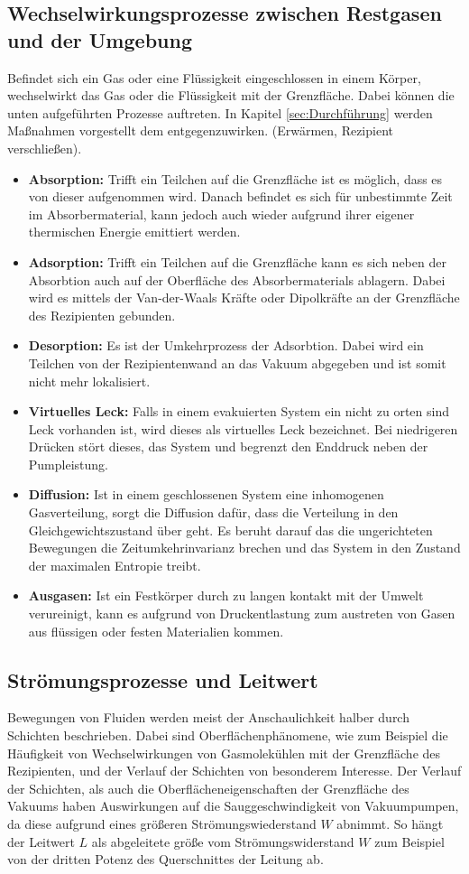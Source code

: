 \subsection{Wechselwirkungsprozesse zwischen Restgasen und der Umgebung}
Befindet sich ein Gas oder eine Flüssigkeit eingeschlossen in einem Körper, wechselwirkt das Gas oder die Flüssigkeit mit der Grenzfläche. Dabei können die unten aufgeführten Prozesse auftreten. In Kapitel \ref{sec:Durchführung} werden Maßnahmen vorgestellt dem entgegenzuwirken. (Erwärmen, Rezipient verschließen).
\begin{itemize}
  \item \textbf{Absorption:} Trifft ein Teilchen auf die Grenzfläche ist es möglich, dass es von dieser aufgenommen wird. Danach befindet es sich für unbestimmte Zeit im Absorbermaterial, kann jedoch auch wieder aufgrund ihrer eigener thermischen Energie emittiert werden.
  \item \textbf{Adsorption:} Trifft ein Teilchen auf die Grenzfläche kann es sich neben der Absorbtion auch auf der Oberfläche des Absorbermaterials ablagern. Dabei wird es mittels der Van-der-Waals Kräfte oder Dipolkräfte an der Grenzfläche des Rezipienten gebunden.
  \item \textbf{Desorption:} Es ist der Umkehrprozess der Adsorbtion. Dabei wird ein Teilchen von der Rezipientenwand an das Vakuum abgegeben und ist somit nicht mehr lokalisiert.
  \item \textbf{Virtuelles Leck:} Falls in einem evakuierten System ein nicht zu orten sind Leck vorhanden ist, wird dieses als virtuelles Leck bezeichnet. Bei niedrigeren Drücken stört dieses, das System und begrenzt den Enddruck neben der Pumpleistung.
  \item \textbf{Diffusion:} Ist in einem geschlossenen System eine inhomogenen Gasverteilung, sorgt die Diffusion dafür, dass die Verteilung in den Gleichgewichtszustand über geht. Es beruht darauf das die ungerichteten Bewegungen die Zeitumkehrinvarianz brechen und das System in den Zustand der maximalen Entropie treibt.
  \item \textbf{Ausgasen:} Ist ein Festkörper durch zu langen kontakt mit der Umwelt verureinigt, kann es aufgrund von Druckentlastung zum austreten von Gasen aus flüssigen oder festen Materialien kommen.
\end{itemize}
\subsection{Strömungsprozesse und Leitwert}
Bewegungen von Fluiden werden meist der Anschaulichkeit halber durch Schichten beschrieben. Dabei sind Oberflächenphänomene, wie zum Beispiel die Häufigkeit von Wechselwirkungen von Gasmolekühlen mit der Grenzfläche des Rezipienten, und der Verlauf der Schichten von besonderem Interesse. Der Verlauf der Schichten, als auch die Oberflächeneigenschaften der Grenzfläche des Vakuums haben Auswirkungen auf die Sauggeschwindigkeit von Vakuumpumpen, da diese aufgrund eines größeren Strömungswiederstand $W$ abnimmt. So hängt der Leitwert $L$ als abgeleitete größe vom Strömungswiderstand $W$ zum Beispiel von der dritten Potenz des Querschnittes der Leitung ab. \cite{Jena}
